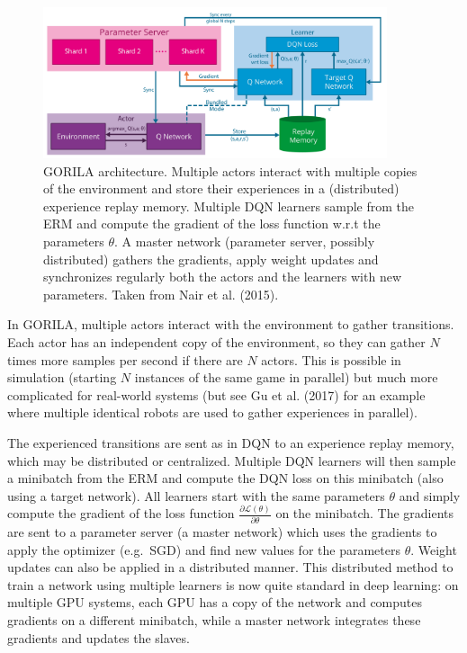 \documentclass[
  letterpaper,
  DIV=11,
  numbers=noendperiod]{scrreprt}
\begin{document}
\begin{figure}

{\centering \includegraphics[width=0.9\textwidth,height=\textheight]{./img/gorila-global.png}

}

\caption{\label{fig-gorila}GORILA architecture. Multiple actors interact
with multiple copies of the environment and store their experiences in a
(distributed) experience replay memory. Multiple DQN learners sample
from the ERM and compute the gradient of the loss function w.r.t the
parameters \(\theta\). A master network (parameter server, possibly
distributed) gathers the gradients, apply weight updates and
synchronizes regularly both the actors and the learners with new
parameters. Taken from Nair et al. (2015).}

\end{figure}

In GORILA, multiple actors interact with the environment to gather
transitions. Each actor has an independent copy of the environment, so
they can gather \(N\) times more samples per second if there are \(N\)
actors. This is possible in simulation (starting \(N\) instances of the
same game in parallel) but much more complicated for real-world systems
(but see Gu et al. (2017) for an example where multiple identical robots
are used to gather experiences in parallel).

The experienced transitions are sent as in DQN to an experience replay
memory, which may be distributed or centralized. Multiple DQN learners
will then sample a minibatch from the ERM and compute the DQN loss on
this minibatch (also using a target network). All learners start with
the same parameters \(\theta\) and simply compute the gradient of the
loss function \(\frac{\partial \mathcal{L}(\theta)}{\partial \theta}\)
on the minibatch. The gradients are sent to a parameter server (a master
network) which uses the gradients to apply the optimizer (e.g.~SGD) and
find new values for the parameters \(\theta\). Weight updates can also
be applied in a distributed manner. This distributed method to train a
network using multiple learners is now quite standard in deep learning:
on multiple GPU systems, each GPU has a copy of the network and computes
gradients on a different minibatch, while a master network integrates
these gradients and updates the slaves.
\end{document}
